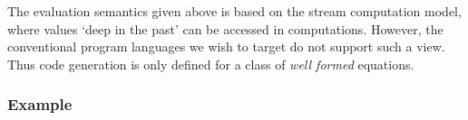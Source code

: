 The evaluation semantics given above is based on the stream
computation model, where values `deep in the past' can be accessed in
computations. However, the conventional program languages we wish to
target do not support such a view. Thus code generation is only
defined for a class of \emph{well formed} equations.

\begin{definition}[Wellformedness]

\end{definition}

\subsubsection{Example}
